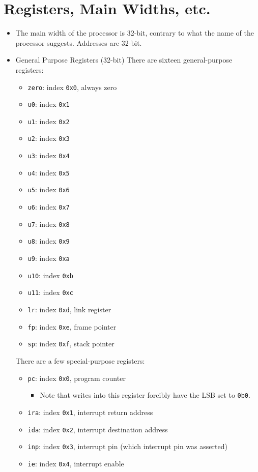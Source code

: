 \documentclass{article}
\begin{document}
\section{Registers, Main Widths, etc.}
	\begin{itemize}
	\item The main width of the processor is 32-bit, contrary to what the
		name of the processor suggests.  Addresses are 32-bit. 
	\item General Purpose Registers (32-bit)
		There are sixteen general-purpose registers:
		\begin{itemize}
		\item \texttt{zero}: index \texttt{0x0}, always zero
		\item \texttt{u0}: index \texttt{0x1}
		\item \texttt{u1}: index \texttt{0x2}
		\item \texttt{u2}: index \texttt{0x3}
		\item \texttt{u3}: index \texttt{0x4}
		\item \texttt{u4}: index \texttt{0x5}
		\item \texttt{u5}: index \texttt{0x6}
		\item \texttt{u6}: index \texttt{0x7}
		\item \texttt{u7}: index \texttt{0x8}
		\item \texttt{u8}: index \texttt{0x9}
		\item \texttt{u9}: index \texttt{0xa}
		\item \texttt{u10}: index \texttt{0xb}
		\item \texttt{u11}: index \texttt{0xc}
		\item \texttt{lr}: index \texttt{0xd}, link register
		\item \texttt{fp}: index \texttt{0xe}, frame pointer
		\item \texttt{sp}: index \texttt{0xf}, stack pointer
		\end{itemize}

		There are a few special-purpose registers:
		\begin{itemize}
		\item \texttt{pc}: index \texttt{0x0}, program counter
			\begin{itemize}
			\item Note that writes into this register forcibly have the LSB
				set to \texttt{0b0}.
			\end{itemize}
		\item \texttt{ira}: index \texttt{0x1}, interrupt return address
		\item \texttt{ida}: index \texttt{0x2}, interrupt destination
			address
		\item \texttt{inp}: index \texttt{0x3}, interrupt pin (which
			interrupt pin was asserted)
		\item \texttt{ie}: index \texttt{0x4}, interrupt enable
		\end{itemize}
	\end{itemize}
\end{document}
